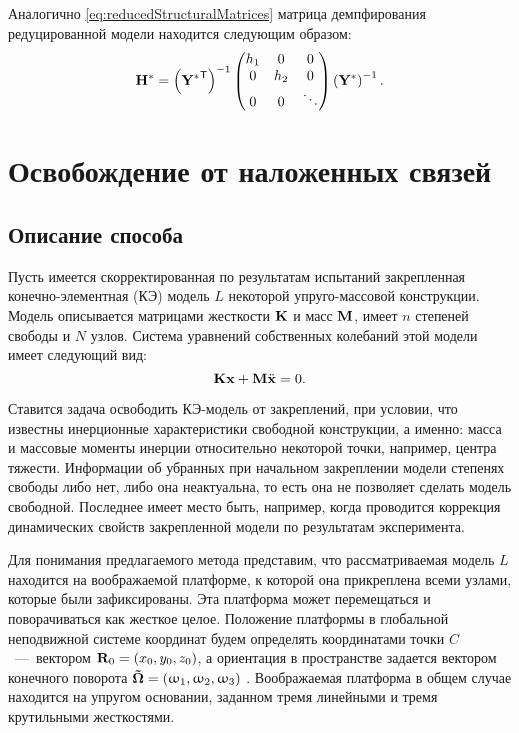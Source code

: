 Аналогично \eqref{eq:reducedStructuralMatrices} матрица демпфирования редуцированной модели находится следующим образом:
\begin{equation}
	\mathbf{H} ^ \ast = 
	\left( \mathbf{Y ^ \ast} ^ \mathsf{T} \right) ^ {-1} 
	\begin{pmatrix}
		h_1 & 0 & 0 \\
		0 & h_2 & 0 \\
		0 & 0 & \ddots
	\end{pmatrix} 
	\left( \mathbf{Y} ^ \ast \right) ^ {-1}.
	\label{eq:reducedDampingMatrix}
\end{equation}

\section{Освобождение от наложенных связей} \label{struct:freeing}

\subsection{Описание способа}

Пусть имеется скорректированная по результатам испытаний закрепленная конечно-элементная (КЭ) модель $ L $ некоторой упруго-массовой конструкции. Модель описывается матрицами жесткости $ \mathbf{K} $  и масс $ \mathbf{M} $, имеет $ n $  степеней свободы и $ N $ узлов. Система уравнений собственных колебаний этой модели имеет следующий вид:
\begin{equation}
	\mathbf{K} \mathbf{x} + \mathbf{M} \ddot{\mathbf{x}} = 0.
	\label{eq:eigFreeProblem}
\end{equation}

Ставится задача освободить КЭ-модель от закреплений, при условии, что известны инерционные характеристики свободной конструкции, а именно: масса и массовые моменты инерции относительно некоторой точки, например, центра тяжести. Информации об убранных при начальном закреплении модели степенях свободы либо нет, либо она неактуальна, то есть она не позволяет сделать модель свободной. Последнее имеет место быть, например, когда проводится коррекция динамических свойств закрепленной модели по результатам эксперимента.

Для понимания предлагаемого метода представим, что рассматриваемая модель $ L $ находится на воображаемой платформе, к которой она прикреплена всеми узлами, которые были зафиксированы. Эта платформа может перемещаться и поворачиваться как жесткое целое. Положение платформы в глобальной неподвижной системе координат будем определять координатами точки $ C $~---~вектором $ \mathbf{R}_0 = (x_0, y_0, z_0) $, а ориентация в пространстве задается вектором конечного поворота $ \mathbf{\vec{\mathbf{\Omega}}} = (\upomega_1, \upomega_2, \upomega_3) $ . Воображаемая платформа в общем случае находится на упругом основании, заданном тремя линейными и тремя крутильными жесткостями.

